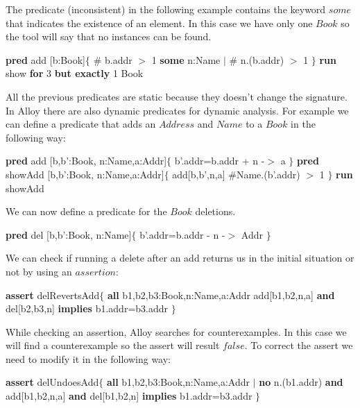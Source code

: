 \documentclass[12pt, a4paper]{report}
\newtheorem[style=M,bodystyle=\normalfont]{theorem}{Theorem}
\newtheorem[style=M,bodystyle=\normalfont]{corollary}{Corollary}
\newtheorem[style=M,bodystyle=\normalfont]{lemma}{Lemma}
\newtheorem[style=M,bodystyle=\normalfont]{definition}{Definition}
\begin{document}
    The predicate (inconsistent) in the following example contains the keyword $some$ that indicates the existence of an element. In this case we have only one $Book$ so the tool 
    will say that no instances can be found. 
    \begin{algorithmic}[H]
        \State \textbf{pred} add [b:Book]$\{$
        \State \:\:\:\:\:\: $\#$ b.addr $>$ 1
        \State \:\:\:\:\:\: \textbf{some} n:Name $\mid$ $\#$ n.(b.addr) $>$ 1
        \State $\}$
        \State \textbf{run} show \textbf{for} 3 \textbf{but exactly} 1 Book
    \end{algorithmic} 
    All the previous predicates are static because they doesn't change the signature. In Alloy there are also dynamic predicates for dynamic analysis. For example we can define a 
    predicate that adds an $Address$ and $Name$ to a $Book$ in the following way: 
    \begin{algorithmic}[H]
        \State \textbf{pred} add [b,b':Book, n:Name,a:Addr]$\{$
        \State \:\:\:\:\:\:\:\: b'.addr=b.addr + n -$>$ a
        \State $\}$
        \State \textbf{pred} showAdd [b,b':Book, n:Name,a:Addr]$\{$
        \State \:\:\:\:\:\:\:\: add[b,b',n,a]
        \State \:\:\:\:\:\:\:\: $\#$Name.(b'.addr) $>$ 1
        \State $\}$
        \State \textbf{run} showAdd
    \end{algorithmic} 
    We can now define a predicate for the $Book$ deletions.  
    \begin{algorithmic}[H]
        \State \textbf{pred} del [b,b':Book, n:Name]$\{$
        \State \:\:\:\:\:\:\:\: b'.addr=b.addr - n -$>$ Addr
        \State $\}$
    \end{algorithmic} 
    We can check if running a delete after an add returns us in the initial situation or not by using an $assertion$:
    \begin{algorithmic}[H]
        \State \textbf{assert} delRevertsAdd$\{$
        \State \:\:\:\:\:\:\:\: \textbf{all} b1,b2,b3:Book,n:Name,a:Addr
        \State \:\:\:\:\:\:\:\: add[b1,b2,n,a] \textbf{and} del[b2,b3,n] 
        \State \:\:\:\:\:\:\:\: \textbf{implies} b1.addr=b3.addr
        \State $\}$
    \end{algorithmic} 
    While checking an assertion, Alloy searches for counterexamples. In this case we will find a counterexample so the assert will result $false$. To correct the assert we need to 
    modify it in the following way: 
    \begin{algorithmic}[H]
        \State \textbf{assert} delUndoesAdd$\{$
        \State \:\:\:\:\:\:\:\: \textbf{all} b1,b2,b3:Book,n:Name,a:Addr $\mid$
        \State \:\:\:\:\:\:\:\: \textbf{no} n.(b1.addr) \textbf{and} add[b1,b2,n,a] \textbf{and} del[b1,b2,n]
        \State \:\:\:\:\:\:\:\: \textbf{implies} b1.addr=b3.addr
        \State $\}$
    \end{algorithmic} 
\end{document}
